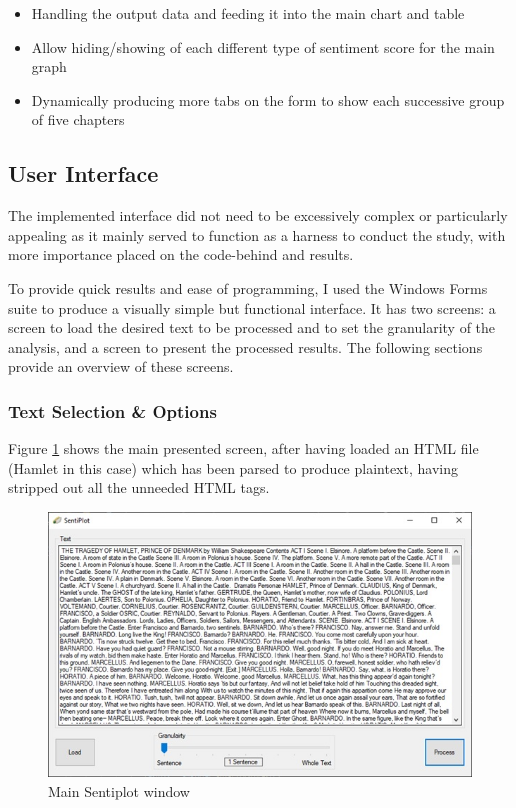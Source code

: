 \documentclass{article}
\begin{document}
            \begin{itemize}
                \item Handling the output data and feeding it into the main chart and table
                \item Allow hiding/showing of each different type of sentiment score for the main graph
                \item Dynamically producing more tabs on the form to show each successive group of five chapters
            \end{itemize}
    \subsection{User Interface}
        The implemented interface did not need to be excessively complex or particularly appealing as it mainly served to function as a harness to conduct the study, with more importance placed on the code-behind and results.

        To provide quick results and ease of programming, I used the Windows Forms suite to produce a visually simple but functional interface. It has two screens: a screen to load the desired text to be processed and to set the granularity of the analysis, and a screen to present the processed results. The following sections provide an overview of these screens.
    \subsubsection{Text Selection \& Options}
    Figure \ref{fig:sentiplot} shows the main presented screen, after having loaded an HTML file (Hamlet in this case) which has been parsed to produce plaintext, having stripped out all the unneeded HTML tags.
        \begin{figure}[H]
            \includegraphics[width=1\textwidth]{Misc/sentiplot}
            \caption{Main Sentiplot window}
            \label{fig:sentiplot}
        \end{figure}
\end{document}
